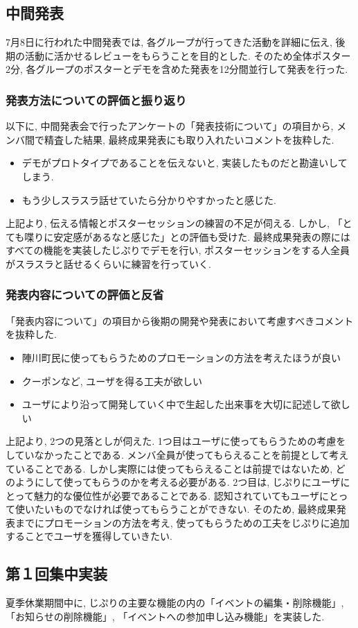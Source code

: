 \subsection{中間発表}
7月8日に行われた中間発表では, 各グループが行ってきた活動を詳細に伝え, 後期の活動に活かせるレビューをもらうことを目的とした.
そのため全体ポスター2分, 各グループのポスターとデモを含めた発表を12分間並行して発表を行った.

\subsubsection{発表方法についての評価と振り返り}
以下に, 中間発表会で行ったアンケートの「発表技術について」の項目から, メンバ間で精査した結果, 最終成果発表にも取り入れたいコメントを抜粋した.
\begin{itemize}
  \item デモがプロトタイプであることを伝えないと, 実装したものだと勘違いしてしまう.
  \item もう少しスラスラ話せていたら分かりやすかったと感じた.
\end{itemize}
    上記より, 伝える情報とポスターセッションの練習の不足が伺える.
    しかし, 「とても喋りに安定感があるなと感じた」との評価も受けた. 最終成果発表の際にはすべての機能を実装したじぷりでデモを行い,
    ポスターセッションをする人全員がスラスラと話せるくらいに練習を行っていく.

\subsubsection{発表内容についての評価と反省}
「発表内容について」の項目から後期の開発や発表において考慮すべきコメントを抜粋した.
\begin{itemize}
  \item 陣川町民に使ってもらうためのプロモーションの方法を考えたほうが良い
  \item クーポンなど, ユーザを得る工夫が欲しい
  \item ユーザにより沿って開発していく中で生起した出来事を大切に記述して欲しい
\end{itemize}
    上記より, 2つの見落としが伺えた. 1つ目はユーザに使ってもらうための考慮をしていなかったことである.
    メンバ全員が使ってもらえることを前提として考えていることである. しかし実際には使ってもらえることは前提ではないため,
    どのようにして使ってもらうのかを考える必要がある. 2つ目は, じぷりにユーザにとって魅力的な優位性が必要であることである.
    認知されていてもユーザにとって使いたいものでなければ使ってもらうことができない. そのため, 最終成果発表までにプロモーションの方法を考え,
    使ってもらうための工夫をじぷりに追加することでユーザを獲得していきたい.


\subsection{第１回集中実装}
夏季休業期間中に, じぷりの主要な機能の内の「イベントの編集・削除機能」, 「お知らせの削除機能」, 「イベントへの参加申し込み機能」を実装した.


